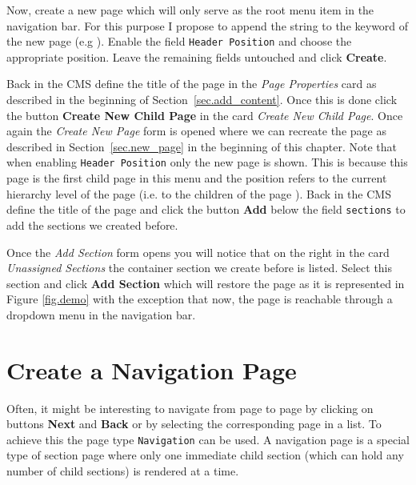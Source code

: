 \documentclass[a4paper,oneside]{book}
\begin{document}
Now, create a new page which will only serve as the root menu item in the navigation bar.
For this purpose I propose to append the string  to the keyword of the new page (e.g ).
Enable the field \texttt{Header Position} and choose the appropriate position.
Leave the remaining fields untouched and click \textbf{Create}.

Back in the CMS define the title of the page in the \emph{Page Properties} card as described in the beginning of Section~\ref{sec.add_content}.
Once this is done click the button \textbf{Create New Child Page} in the card \emph{Create New Child Page}.
Once again the \emph{Create New Page} form is opened where we can recreate the page  as described in Section~\ref{sec.new_page} in the beginning of this chapter.
Note that when enabling \texttt{Header Position} only the new page is shown.
This is because this page is the first child page in this menu and the position refers to the current hierarchy level of the page (i.e. to the children of the page ).
Back in the CMS define the title of the page and click the button \textbf{Add} below the field \texttt{sections} to add the sections we created before.

Once the \emph{Add Section} form opens you will notice that on the right in the card \emph{Unassigned Sections} the container section we create before is listed.
Select this section and click \textbf{Add Section} which will restore the page as it is represented in Figure \ref{fig.demo} with the exception that now, the page is reachable through a dropdown menu in the navigation bar.

\section{Create a Navigation Page}
Often, it might be interesting to navigate from page to page by clicking on buttons \textbf{Next} and \textbf{Back} or by selecting the corresponding page in a list.
To achieve this the page type \texttt{Navigation} can be used.
A navigation page is a special type of section page where only one immediate child section (which can hold any number of child sections) is rendered at a time.
\end{document}
